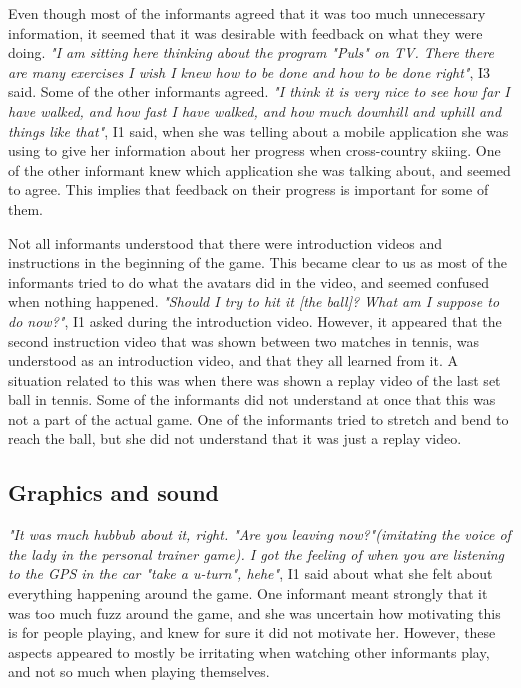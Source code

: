 Even though most of the informants agreed that it was too much unnecessary information, it seemed that it was desirable with feedback on what they were doing. \emph{"I am sitting here thinking about the program "Puls" on TV. There there are many exercises I wish I knew how to be done and how to be done right"}, I3 said. Some of the other informants agreed. \emph{"I think it is very nice to see how far I have walked, and how fast I have walked, and how much downhill and uphill and things like that"}, I1 said, when she was telling about a mobile application she was using to give her information about her progress when cross-country skiing. One of the other informant knew which application she was talking about, and seemed to agree. This implies that feedback on their progress is important for some of them.  

Not all informants understood that there were introduction videos and instructions in the beginning of the game. This became clear to us as most of the informants tried to do what the avatars did in the video, and seemed confused when nothing happened. \emph{"Should I try to hit it [the ball]? What am I suppose to do now?"}, I1 asked during the introduction video. However, it appeared that the second instruction video that was shown between two matches in tennis, was understood as an introduction video, and that they all learned from it. A situation related to this was when there was shown a replay video of the last set ball in tennis. Some of the informants did not understand at once that this was not a part of the actual game. One of the informants tried to stretch and bend to reach the ball, but she did not understand that it was just a replay video. 

\subsection{Graphics and sound}
\emph{"It was much hubbub about it, right. "Are you leaving now?"(imitating the voice of the lady in the personal trainer game). I got the feeling of when you are listening to the GPS in the car "take a u-turn", hehe"}, I1 said about what she felt about everything happening around the game. One informant meant strongly that it was too much fuzz around the game, and she was uncertain how motivating this is for people playing, and knew for sure it did not motivate her. However, these aspects appeared to mostly be irritating when watching other informants play, and not so much when playing themselves. 

